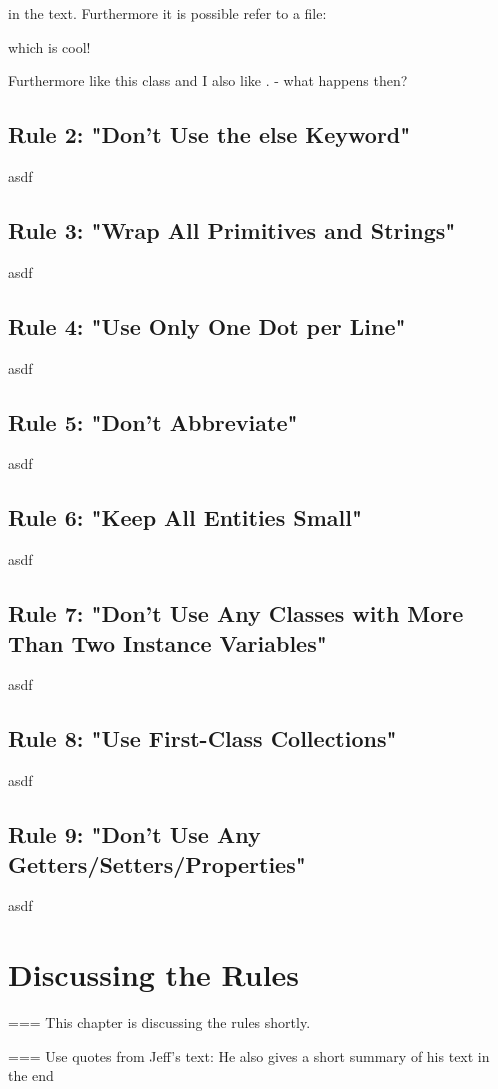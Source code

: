  in the text. 
Furthermore it is possible refer to a file: 



which is cool!

Furthermore like this class  and I also like .  - what happens then?

\subsection{Rule 2: "Don’t Use the else Keyword"}
asdf
\subsection{Rule 3: "Wrap All Primitives and Strings"}
asdf
\subsection{Rule 4: "Use Only One Dot per Line"}
asdf
\subsection{Rule 5: "Don't Abbreviate"}
asdf
\subsection{Rule 6: "Keep All Entities Small"}
asdf
\subsection{Rule 7: "Don’t Use Any Classes with More Than Two Instance Variables"}
asdf
\subsection{Rule 8: "Use First-Class Collections"}
asdf
\subsection{Rule 9: "Don’t Use Any Getters/Setters/Properties"}
asdf
\section{Discussing the Rules}
=== This chapter is discussing the rules shortly. 

=== Use quotes from Jeff's text: He also gives a short summary of his text in the end

